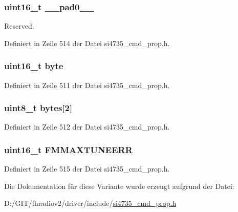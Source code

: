 \subsubsection[{\+\_\+\+\_\+pad0\+\_\+\+\_\+}]{\setlength{\rightskip}{0pt plus 5cm}uint16\+\_\+t \+\_\+\+\_\+pad0\+\_\+\+\_\+}\label{unionfm__max__tune__err_a77132c2c26a75f5b8751b235cda23828}


Reserved. 



Definiert in Zeile 514 der Datei si4735\+\_\+cmd\+\_\+prop.\+h.

\hypertarget{unionfm__max__tune__err_ab0549c1b5ea980a02e7eab77e21fea49}{}
\subsubsection[{byte}]{\setlength{\rightskip}{0pt plus 5cm}uint16\+\_\+t byte}\label{unionfm__max__tune__err_ab0549c1b5ea980a02e7eab77e21fea49}


Definiert in Zeile 511 der Datei si4735\+\_\+cmd\+\_\+prop.\+h.

\hypertarget{unionfm__max__tune__err_a46e4c05d20a047ec169f60d3167e912e}{}
\subsubsection[{bytes}]{\setlength{\rightskip}{0pt plus 5cm}uint8\+\_\+t bytes\mbox{[}2\mbox{]}}\label{unionfm__max__tune__err_a46e4c05d20a047ec169f60d3167e912e}


Definiert in Zeile 512 der Datei si4735\+\_\+cmd\+\_\+prop.\+h.

\hypertarget{unionfm__max__tune__err_a89a109f2f7c80bdca8ffa991e3d8b2b7}{}
\subsubsection[{F\+M\+M\+A\+X\+T\+U\+N\+E\+E\+R\+R}]{\setlength{\rightskip}{0pt plus 5cm}uint16\+\_\+t F\+M\+M\+A\+X\+T\+U\+N\+E\+E\+R\+R}\label{unionfm__max__tune__err_a89a109f2f7c80bdca8ffa991e3d8b2b7}


Definiert in Zeile 515 der Datei si4735\+\_\+cmd\+\_\+prop.\+h.



Die Dokumentation für diese Variante wurde erzeugt aufgrund der Datei\+:\begin{DoxyCompactItemize}
\item 
D\+:/\+G\+I\+T/fhradiov2/driver/include/\hyperlink{si4735__cmd__prop_8h}{si4735\+\_\+cmd\+\_\+prop.\+h}\end{DoxyCompactItemize}
